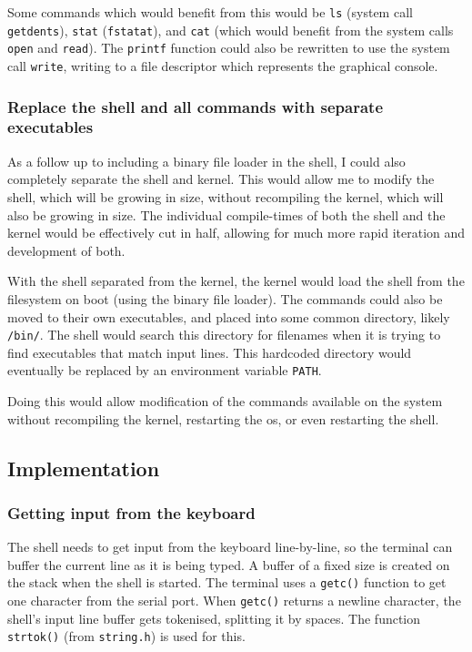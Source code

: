 \documentclass{article}
\begin{document}
Some commands which would benefit from this would be \texttt{ls} (system call
\texttt{getdents}), \texttt{stat} (\texttt{fstatat}), and \texttt{cat} (which
would benefit from the system calls \texttt{open} and \texttt{read}). The
\texttt{printf} function could also be rewritten to use the system call
\texttt{write}, writing to a file descriptor which represents the graphical
console.

\subsubsection{Replace the shell and all commands with separate executables}
As a follow up to including a binary file loader in the shell, I could also
completely separate the shell and kernel. This would allow me to modify the
shell, which will be growing in size, without recompiling the kernel, which
will also be growing in size. The individual compile-times of both the shell
and the kernel would be effectively cut in half, allowing for much more rapid
iteration and development of both.

With the shell separated from the kernel, the kernel would load the shell from
the filesystem on boot (using the binary file loader). The commands could also
be moved to their own executables, and placed into some common directory,
likely \texttt{/bin/}. The shell would search this directory for filenames when
it is trying to find executables that match input lines. This hardcoded
directory would eventually be replaced by an environment variable
\texttt{PATH}.

Doing this would allow modification of the commands available on the system
without recompiling the kernel, restarting the \gls{os}, or even restarting the
shell.


\subsection{Implementation}
\subsubsection{Getting input from the keyboard}
The shell needs to get input from the keyboard line-by-line, so the terminal
can buffer the current line as it is being typed. A buffer of a fixed size is
created on the stack when the shell is started. The terminal uses a
\texttt{getc()} function to get one character from the serial port. When
\texttt{getc()} returns a newline character, the shell's input line buffer gets
tokenised, splitting it by spaces. The function \texttt{strtok()} (from
\texttt{string.h}) is used for this.
\end{document}

